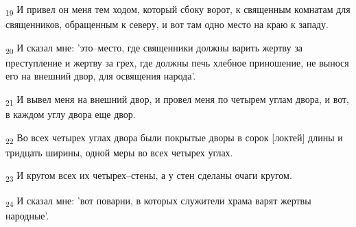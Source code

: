 \begin{tcolorbox}
\textsubscript{19} И привел он меня тем ходом, который сбоку ворот, к священным комнатам для священников, обращенным к северу, и вот там одно место на краю к западу.
\end{tcolorbox}
\begin{tcolorbox}
\textsubscript{20} И сказал мне: 'это--место, где священники должны варить жертву за преступление и жертву за грех, где должны печь хлебное приношение, не вынося его на внешний двор, для освящения народа'.
\end{tcolorbox}
\begin{tcolorbox}
\textsubscript{21} И вывел меня на внешний двор, и провел меня по четырем углам двора, и вот, в каждом углу двора еще двор.
\end{tcolorbox}
\begin{tcolorbox}
\textsubscript{22} Во всех четырех углах двора были покрытые дворы в сорок [локтей] длины и тридцать ширины, одной меры во всех четырех углах.
\end{tcolorbox}
\begin{tcolorbox}
\textsubscript{23} И кругом всех их четырех--стены, а у стен сделаны очаги кругом.
\end{tcolorbox}
\begin{tcolorbox}
\textsubscript{24} И сказал мне: 'вот поварни, в которых служители храма варят жертвы народные'.
\end{tcolorbox}
